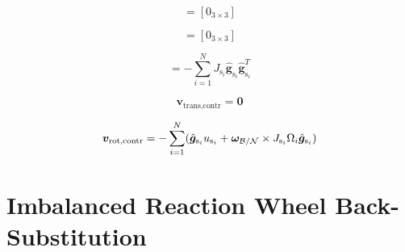 \documentclass[]{BasiliskReportMemo}
\begin{document}
\begin{equation}
[B_\text{contr}] = [0_{3 \times 3}]
\end{equation}

\begin{equation}
[C_\text{contr}] = [0_{3 \times 3}]
\end{equation}

\begin{equation}
[D_\text{contr}] = -\sum_{i=1}^{N}J_{\text{s}_i} \hat{\bm g}_{\text{s}_i} \hat{\bm g}_{\text{s}_i}^T
\end{equation}

\begin{equation}
\bm v_{\text{trans,contr}} = \bm 0
\end{equation}

\begin{equation}
\bm v_{\text{rot,contr}} =  - \sum_{i=1}^{N}(\hat{\bm g}_{\text{s}_i} u_{\text{s}_i} + \bm\omega_{\cal B/N}\times J_{\text{s}_i}\Omega_i\hat{\bm g}_{\text{s}_i})
\end{equation}

\section{Imbalanced Reaction Wheel Back-Substitution}
\end{document}
